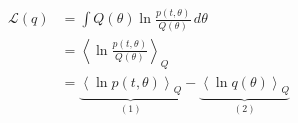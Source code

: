 \documentclass[10pt]{article}
\newcommand{\Angle}[1]{\left \langle #1 \right \rangle}
\newcommand{\Eq}[1]{\Angle{#1}_Q}
\begin{document}
	\begin{align}
		\mathcal{L}(q)&=\int Q(\theta) \ln{\frac{p(t,\theta)}{Q(\theta)}} \, d\theta \\
		&=\Eq{\ln{\frac{p(t,\theta)}{Q(\theta)}}} \\
		&=\underbrace{\Eq{\ln{p(t,\theta)}}}_{(1)} - \underbrace{\Eq{\ln{q(\theta)}}}_{(2)}
	\end{align}
	
\end{document}
